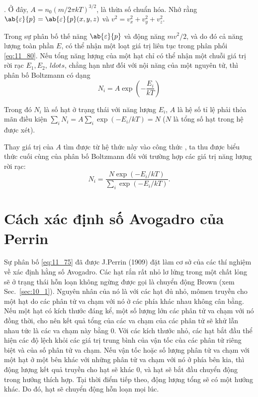 . Ở đây, $A=n_0(m/2\pi kT)^{3/2}$, là thừa số chuẩn hóa. Nhớ rằng $\ab{\varepsilon}{p}=\ab{\varepsilon}{p}(x,y,z)$ và $v^2=v_x^2+v_y^2+v_z^2$.

Trong sự phân bố thế năng $\ab{\varepsilon}{p}$ và động năng $mv^2/2$, và do đó cả năng lượng toàn phần $E$, có thể nhận một loạt giá trị liên tục trong phân phối \eqref{eq:11_80}. Nếu tổng năng lượng của một hạt chỉ có thể nhận một chuỗi giá trị rời rạc $ E_1, E_2, \ ldots $, chẳng hạn như đối với nội năng của một nguyên tử, thì phân bố Boltzmann có dạng
\begin{equation}\label{eq:11_81}
	N_i = A \exp\left(-\frac{E_i}{kT}\right)
\end{equation}

\noindent
Trong đó $N_i$ là số hạt ở trạng thái với năng lượng $E_i$, $A$ là hệ số tỉ lệ phải thỏa mãn điều kiện $\sum_i N_i=A\sum_i\exp(-E_i/kT)=N$ ($N$ là tổng số hạt trong hệ được xét).

Thay giá trị của $A$ tìm được từ hệ thức này vào công thức , ta thu được biểu thức cuối cùng của phân bố Boltzmann đối với trường hợp các giá trị năng lượng rời rạc:
\begin{equation}\label{eq:11_82}
	N_i = \frac{N \exp(-E_i/kT)}{\displaystyle\sum_i\exp(-E_i/kT)}.
\end{equation}

\section{Cách xác định số Avogadro của Perrin}\label{sec:11_9}

Sự phân bố \eqref{eq:11_75} đã được J.Perrin (1909) đặt làm cơ sở của các thí nghiệm về xác định hằng số Avogadro. Các hạt rắn rất nhỏ lơ lửng trong một chất lỏng sẽ ở trạng thái hỗn loạn không ngừng được gọi là chuyển động Brown (xem Sec.~\ref{sec:10_1}). Nguyên nhân của nó là với các hạt đủ nhỏ, mômen truyền cho một hạt do các phân tử va chạm với nó ở các phía khác nhau không cân bằng. Nếu một hạt có kích thước đáng kể, một số lượng lớn các phân tử va chạm với nó đồng thời, cho nên kết quả tổng của các va chạm của các phân tử sẽ khử lẫn nhau tức là các va chạm này bằng 0. Với các kích thước nhỏ, các hạt bắt đầu thể hiện các độ lệch khỏi các giá trị trung bình của vận tốc của các phân tử riêng biệt và của số phân tử va chạm. Nếu vận tốc hoặc số lượng phân tử va chạm với một hạt ở một bên khác với những phân tử va chạm với nó ở phía bên kia, thì động lượng kết quả truyền cho hạt sẽ khác 0, và hạt sẽ bắt đầu chuyển động trong hướng thích hợp. Tại thời điểm tiếp theo, động lượng tổng sẽ có một hướng khác. Do đó, hạt sẽ chuyển động hỗn loạn mọi lúc.

